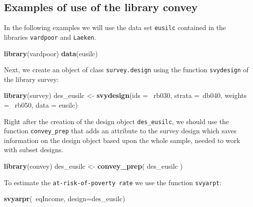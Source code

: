\documentclass[]{book}
\newenvironment{Shaded}{\begin{snugshade}}{\end{snugshade}}
\newcommand{\KeywordTok}[1]{\textcolor[rgb]{0.13,0.29,0.53}{\textbf{{#1}}}}
\newcommand{\DataTypeTok}[1]{\textcolor[rgb]{0.13,0.29,0.53}{{#1}}}
\newcommand{\StringTok}[1]{\textcolor[rgb]{0.31,0.60,0.02}{{#1}}}
\newcommand{\NormalTok}[1]{{#1}}
\begin{document}
\subsection{Examples of use of the library
convey}\label{examples-of-use-of-the-library-convey}

In the following examples we will use the data set \texttt{eusilc}
contained in the libraries \texttt{vardpoor} and \texttt{Laeken}.

\begin{Shaded}
\begin{Highlighting}[]
\KeywordTok{library}\NormalTok{(vardpoor)}
\KeywordTok{data}\NormalTok{(eusilc)}
\end{Highlighting}
\end{Shaded}

Next, we create an object of class \texttt{survey.design} using the
function \texttt{svydesign} of the library survey:

\begin{Shaded}
\begin{Highlighting}[]
\KeywordTok{library}\NormalTok{(survey)}
\NormalTok{des_eusilc <-}\StringTok{ }\KeywordTok{svydesign}\NormalTok{(}\DataTypeTok{ids =} \NormalTok{~rb030, }\DataTypeTok{strata =}\NormalTok{~db040,  }\DataTypeTok{weights =} \NormalTok{~rb050, }\DataTypeTok{data =} \NormalTok{eusilc)}
\end{Highlighting}
\end{Shaded}

Right after the creation of the design object \texttt{des\_eusilc}, we
should use the function \texttt{convey\_prep} that adds an attribute to
the survey design which saves information on the design object based
upon the whole sample, needed to work with subset designs.

\begin{Shaded}
\begin{Highlighting}[]
\KeywordTok{library}\NormalTok{(convey)}
\NormalTok{des_eusilc <-}\StringTok{ }\KeywordTok{convey_prep}\NormalTok{( des_eusilc )}
\end{Highlighting}
\end{Shaded}

To estimate the \texttt{at-risk-of-poverty\ rate} we use the function
\texttt{svyarpt}:

\begin{Shaded}
\begin{Highlighting}[]
\KeywordTok{svyarpr}\NormalTok{(~eqIncome, }\DataTypeTok{design=}\NormalTok{des_eusilc)}
\end{Highlighting}
\end{Shaded}
\end{document}
